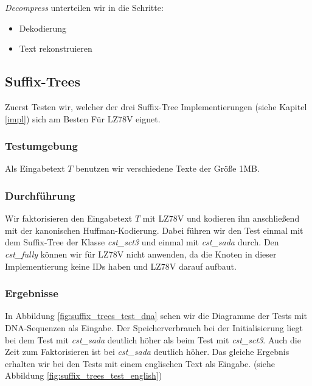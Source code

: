 \documentclass[a4paper,11pt]{scrartcl}%
\theoremstyle{change}
\theoremstyle{nonumberplain}
\theoremstyle{change}
\theoremstyle{nonumberplain}
\theoremstyle{change}
\theoremstyle{nonumberplain}
\begin{document}
\textit{Decompress} unterteilen wir in die Schritte: 

\begin{itemize}
	\item Dekodierung
	\item Text rekonstruieren
\end{itemize}

\subsection{Suffix-Trees}\label{test:suffix-tree}

Zuerst Testen wir, welcher der drei Suffix-Tree Implementierungen (siehe Kapitel \ref{impl}) sich am Besten Für LZ78V eignet.

\subsubsection{Testumgebung}

Als Eingabetext $T$ benutzen wir verschiedene Texte der Größe 1MB. 

\subsubsection{Durchführung}

Wir faktorisieren den Eingabetext $T$ mit LZ78V und kodieren ihn anschließend mit der kanonischen Huffman-Kodierung. Dabei führen wir den Test einmal mit dem Suffix-Tree der Klasse \textit{cst\_sct3} und einmal mit \textit{cst\_sada} durch. Den \textit{cst\_fully} können wir für LZ78V nicht anwenden, da die Knoten in dieser Implementierung keine IDs haben und LZ78V darauf aufbaut.

\subsubsection{Ergebnisse}

In Abbildung \ref{fig:suffix_trees_test_dna} sehen wir die Diagramme der Tests mit DNA-Sequenzen als Eingabe. Der Speicherverbrauch bei der Initialisierung liegt bei dem Test mit \textit{cst\_sada} deutlich höher als beim Test mit \textit{cst\_sct3}. Auch die Zeit zum Faktorisieren ist bei \textit{cst\_sada} deutlich höher.
\newline
Das gleiche Ergebnis erhalten wir bei den Tests mit einem englischen Text als Eingabe. (siehe Abbildung \ref{fig:suffix_trees_test_english})
\end{document}
